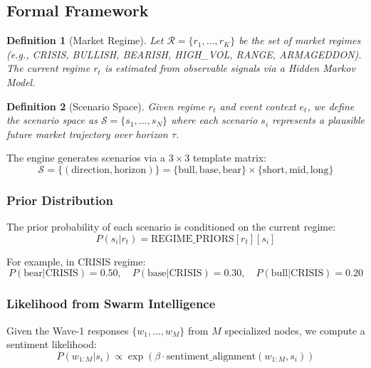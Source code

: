 \documentclass[11pt, a4paper]{article}
\newtheorem{definition}{Definition}
\begin{document}
\subsection{Formal Framework}

\begin{definition}[Market Regime]
Let $\mathcal{R} = \{r_1, \ldots, r_K\}$ be the set of market regimes (e.g., CRISIS, BULLISH, BEARISH, HIGH\_VOL, RANGE, ARMAGEDDON). The current regime $r_t$ is estimated from observable signals via a Hidden Markov Model.
\end{definition}

\begin{definition}[Scenario Space]
Given regime $r_t$ and event context $e_t$, we define the scenario space as $\mathcal{S} = \{s_1, \ldots, s_N\}$ where each scenario $s_i$ represents a plausible future market trajectory over horizon $\tau$.
\end{definition}

The engine generates scenarios via a $3 \times 3$ template matrix:
\begin{equation}
  \mathcal{S} = \{(\text{direction}, \text{horizon})\} = \{\text{bull}, \text{base}, \text{bear}\} \times \{\text{short}, \text{mid}, \text{long}\}
\end{equation}

\subsubsection{Prior Distribution}

The prior probability of each scenario is conditioned on the current regime:
\begin{equation}
  P(s_i | r_t) = \text{REGIME\_PRIORS}[r_t][s_i]
\end{equation}

For example, in CRISIS regime:
\begin{equation}
  P(\text{bear}|\text{CRISIS}) = 0.50, \quad P(\text{base}|\text{CRISIS}) = 0.30, \quad P(\text{bull}|\text{CRISIS}) = 0.20
\end{equation}

\subsubsection{Likelihood from Swarm Intelligence}

Given the Wave-1 responses $\{w_1, \ldots, w_M\}$ from $M$ specialized nodes, we compute a sentiment likelihood:
\begin{equation}
  P(w_{1:M} | s_i) \propto \exp\left(\beta \cdot \text{sentiment\_alignment}(w_{1:M}, s_i)\right)
\end{equation}
\end{document}
